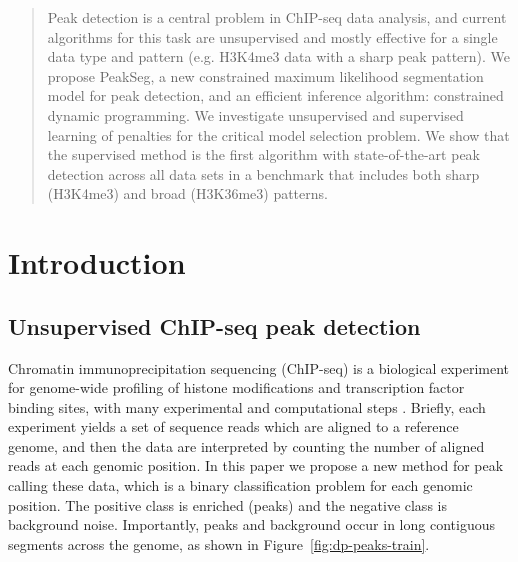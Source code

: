 \documentclass{article}
\begin{document}

\begin{abstract}
  Peak detection is a central problem in ChIP-seq data analysis, and
  current algorithms for this task are unsupervised and mostly
  effective for a single data type and pattern (e.g. H3K4me3 data with
  a sharp peak pattern). We propose PeakSeg, a new constrained maximum
  likelihood segmentation model for peak detection, and an efficient
  inference algorithm: constrained dynamic programming. We investigate
  un\-super\-vised and super\-vised learning of penalties for
  the critical model selection problem. We show that the 
  super\-vised method is the first algorithm with state-of-the-art peak
  detection across all data sets in a benchmark that includes both
  sharp (H3K4me3) and broad (H3K36me3) patterns.
\end{abstract}

\section{Introduction}

\subsection{Unsupervised ChIP-seq peak detection}

Chromatin immunoprecipitation sequencing (ChIP-seq) is a biological
experiment for genome-wide profiling of histone modifications and
transcription factor binding sites, with many experimental and
computational steps \citep{practical}. Briefly, each experiment yields
a set of sequence reads which are aligned to a reference genome, and
then the data are interpreted by counting the number of aligned reads
at each genomic position. In this paper we propose a new method for
peak calling these data, which is a binary classification problem for
each genomic position. The positive class is enriched (peaks) and the
negative class is background noise. Importantly, peaks and background
occur in long contiguous segments across the genome, as shown in
Figure~\ref{fig:dp-peaks-train}.
\end{document}
